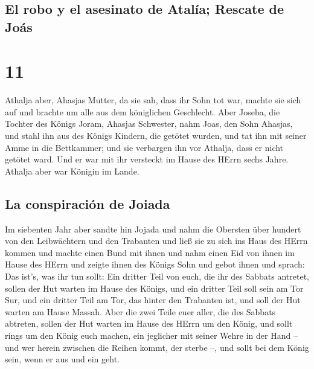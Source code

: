 \hypertarget{el-robo-y-el-asesinato-de-ataluxeda-rescate-de-jouxe1s}{%
\subsection{El robo y el asesinato de Atalía; Rescate de
Joás}\label{el-robo-y-el-asesinato-de-ataluxeda-rescate-de-jouxe1s}}

\hypertarget{section-10}{%
\section{11}\label{section-10}}

 Athalja aber, Ahasjas Mutter, da sie sah, dass ihr Sohn
tot war, machte sie sich auf und brachte um alle aus dem königlichen
Geschlecht.  Aber Joseba, die Tochter des Königs Joram,
Ahasjas Schwester, nahm Joas, den Sohn Ahasjas, und stahl ihn aus des
Königs Kindern, die getötet wurden, und tat ihn mit seiner Amme in die
Bettkammer; und sie verbargen ihn vor Athalja, dass er nicht getötet
ward.  Und er war mit ihr versteckt im Hause des HErrn
sechs Jahre. Athalja aber war Königin im Lande.

\hypertarget{la-conspiraciuxf3n-de-joiada}{%
\subsection{La conspiración de
Joiada}\label{la-conspiraciuxf3n-de-joiada}}

 Im siebenten Jahr aber sandte hin Jojada und nahm die
Obersten über hundert von den Leibwächtern und den Trabanten und ließ
sie zu sich ins Haus des HErrn kommen und machte einen Bund mit ihnen
und nahm einen Eid von ihnen im Hause des HErrn und zeigte ihnen des
Königs Sohn  und gebot ihnen und sprach: Das ist's, was
ihr tun sollt: Ein dritter Teil von euch, die ihr des Sabbats antretet,
sollen der Hut warten im Hause des Königs,  und ein
dritter Teil soll sein am Tor Sur, und ein dritter Teil am Tor, das
hinter den Trabanten ist, und soll der Hut warten am Hause Massah.
 Aber die zwei Teile euer aller, die des Sabbats abtreten,
sollen der Hut warten im Hause des HErrn um den König, 
und sollt rings um den König euch machen, ein jeglicher mit seiner Wehre
in der Hand -- und wer herein zwischen die Reihen kommt, der sterbe --,
und sollt bei dem König sein, wenn er aus und ein geht.

